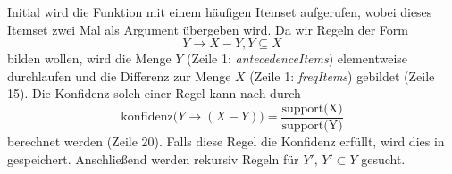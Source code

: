 Initial wird die Funktion  mit einem häufigen Itemset aufgerufen, wobei dieses Itemset zwei Mal als Argument übergeben wird. Da wir Regeln der Form 
\begin{equation*}
	Y \rightarrow X - Y, Y \subseteq X
\end{equation*}
bilden wollen, wird die Menge $Y$ (Zeile 1: \textit{antecedenceItems}) elementweise durchlaufen und die Differenz zur Menge $X$ (Zeile 1: \textit{freqItems}) gebildet (Zeile 15). Die Konfidenz solch einer Regel kann nach \citet{EsSa00} durch 
\begin{equation*}
	\text{konfidenz(}Y \rightarrow (X-Y)\text{)} = \frac{\text{support(X)}}{\text{support(Y)}}
\end{equation*}
berechnet werden (Zeile 20). Falls diese Regel die Konfidenz erfüllt, wird dies in \mbox{} gespeichert. Anschließend werden rekursiv Regeln für $Y'$, $Y' \subset Y$ gesucht.


\clearpage
